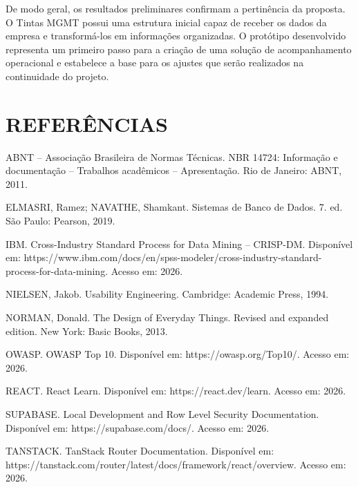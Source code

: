 \documentclass[12pt,a4paper]{article}
\begin{document}
De modo geral, os resultados preliminares confirmam a pertinência da proposta. O Tintas MGMT possui uma estrutura inicial capaz de receber os dados da empresa e transformá-los em informações organizadas. O protótipo desenvolvido representa um primeiro passo para a criação de uma solução de acompanhamento operacional e estabelece a base para os ajustes que serão realizados na continuidade do projeto.

\newpage
\section{REFERÊNCIAS}
ABNT – Associação Brasileira de Normas Técnicas. NBR 14724: Informação e documentação – Trabalhos acadêmicos – Apresentação. Rio de Janeiro: ABNT, 2011.

ELMASRI, Ramez; NAVATHE, Shamkant. Sistemas de Banco de Dados. 7. ed. São Paulo: Pearson, 2019.

IBM. Cross-Industry Standard Process for Data Mining – CRISP-DM. Disponível em: https://www.ibm.com/docs/en/spss-modeler/cross-industry-standard-process-for-data-mining. Acesso em: 2026.

NIELSEN, Jakob. Usability Engineering. Cambridge: Academic Press, 1994.

NORMAN, Donald. The Design of Everyday Things. Revised and expanded edition. New York: Basic Books, 2013.

OWASP. OWASP Top 10. Disponível em: https://owasp.org/Top10/. Acesso em: 2026.

REACT. React Learn. Disponível em: https://react.dev/learn. Acesso em: 2026.

SUPABASE. Local Development and Row Level Security Documentation. Disponível em: https://supabase.com/docs/. Acesso em: 2026.

TANSTACK. TanStack Router Documentation. Disponível em: https://tanstack.com/router/latest/docs/framework/react/overview. Acesso em: 2026.
\end{document}
